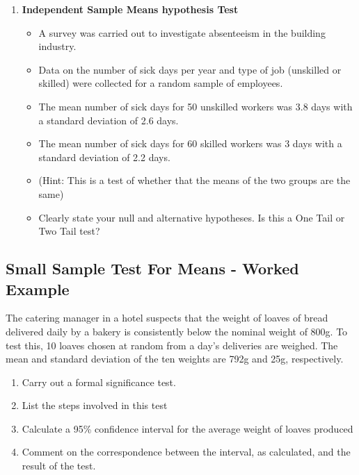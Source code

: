 \begin{enumerate}
\begin{itemize}
	\end{itemize}
	
	\item \textbf{Independent Sample Means hypothesis Test }
	
	\begin{itemize}
		\item 	A survey was carried out to investigate absenteeism in the building industry.
		\item Data on the number of sick days per year and type of job (unskilled or skilled)
		were collected for a random sample of employees.
		\item The mean number of sick days for 50 unskilled workers was 3.8 days with a standard deviation of 2.6 days. 
		\item The mean number of sick days for 60 skilled workers was 3 days with a standard deviation of 2.2 days. 
		\item (Hint: This is a test of whether that the means of the two groups are the same)
		
		\item Clearly state your null and alternative hypotheses.
		Is this a One Tail or Two Tail test?
	\end{itemize}
	
\end{enumerate}		








\subsection{Small Sample Test For Means - Worked Example}
The catering manager in a hotel suspects that the weight of loaves of bread delivered
daily by a bakery is consistently below the nominal weight of 800g. To test this,
10 loaves chosen at random from a day’s deliveries are weighed. The mean and
standard deviation of the ten weights are 792g and 25g, respectively.

\begin{enumerate}
	\item  Carry out a formal significance test.
	\item List the steps involved in this test 
	\item Calculate a 95\% confidence interval for the average weight of loaves produced
	\item Comment on the correspondence between the interval, as calculated, and the
	result of the test.
\end{enumerate}	



